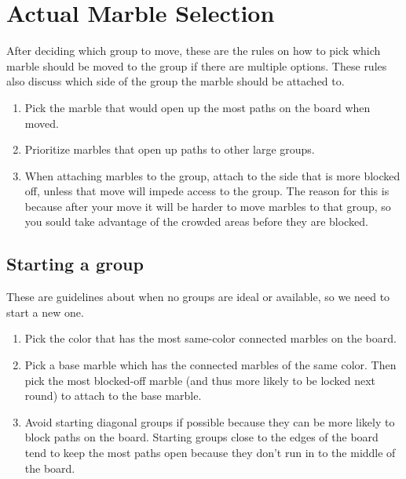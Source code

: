 \documentclass[a4paper,12pt]{article}
\begin{document}
\section*{Actual Marble Selection}

After deciding which group to move, these are the rules on how to pick which marble should be moved to the group
if there are multiple options. These rules also discuss which side of the group the marble should be attached to.

\begin{enumerate}[1)]
    
    \item Pick the marble that would open up the most paths on the board when moved. 
    \item Prioritize marbles that open up paths to other large groups.
    \item When attaching marbles to the group, attach to the side that is more blocked off, unless that move will
        impede access to the group. The reason for this is because after your move it will be harder to move marbles
        to that group, so you sould take advantage of the crowded areas before they are blocked.

\end{enumerate}

\subsection*{Starting a group}

These are guidelines about when no groups are ideal or available, so we need to start a new one.

\begin{enumerate}[1)]
    
    \item Pick the color that has the most same-color connected marbles on the board.
    \item Pick a base marble which has the connected marbles of the same color. Then pick the most blocked-off
        marble (and thus more likely to be locked next round) to attach to the base marble.
    \item Avoid starting diagonal groups if possible because they can be more likely to block paths on the board.
        Starting groups close to the edges of the board tend to keep the most paths open because they don't run in
        to the middle of the board.


\end{enumerate}
\end{document}
